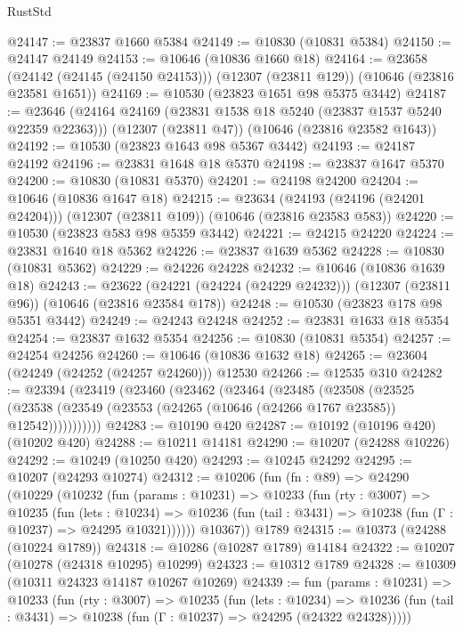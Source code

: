 \begin{lexlean}{RustStd}
\begin{coremodule}
@24147 := @23837 @1660 @5384
@24149 := @10830 (@10831 @5384)
@24150 := @24147 @24149
@24153 := @10646 (@10836 @1660 @18)
@24164 := @23658
    (@24142 (@24145 (@24150 @24153)))
    (@12307 (@23811 @129))
    (@10646 (@23816 @23581 @1651))
@24169 := @10530 (@23823 @1651 @98 @5375 @3442)
@24187 := @23646
    (@24164 @24169 (@23831 @1538 @18 @5240 (@23837 @1537 @5240 @22359 @22363)))
    (@12307 (@23811 @47))
    (@10646 (@23816 @23582 @1643))
@24192 := @10530 (@23823 @1643 @98 @5367 @3442)
@24193 := @24187 @24192
@24196 := @23831 @1648 @18 @5370
@24198 := @23837 @1647 @5370
@24200 := @10830 (@10831 @5370)
@24201 := @24198 @24200
@24204 := @10646 (@10836 @1647 @18)
@24215 := @23634
    (@24193 (@24196 (@24201 @24204)))
    (@12307 (@23811 @109))
    (@10646 (@23816 @23583 @583))
@24220 := @10530 (@23823 @583 @98 @5359 @3442)
@24221 := @24215 @24220
@24224 := @23831 @1640 @18 @5362
@24226 := @23837 @1639 @5362
@24228 := @10830 (@10831 @5362)
@24229 := @24226 @24228
@24232 := @10646 (@10836 @1639 @18)
@24243 := @23622
    (@24221 (@24224 (@24229 @24232)))
    (@12307 (@23811 @96))
    (@10646 (@23816 @23584 @178))
@24248 := @10530 (@23823 @178 @98 @5351 @3442)
@24249 := @24243 @24248
@24252 := @23831 @1633 @18 @5354
@24254 := @23837 @1632 @5354
@24256 := @10830 (@10831 @5354)
@24257 := @24254 @24256
@24260 := @10646 (@10836 @1632 @18)
@24265 := @23604 (@24249 (@24252 (@24257 @24260))) @12530
@24266 := @12535 @310
@24282 := @23394
    (@23419
      (@23460
        (@23462
          (@23464
            (@23485
              (@23508
                (@23525
                  (@23538 (@23549 (@23553 (@24265 (@10646 (@24266 @1767 @23585)) @12542)))))))))))
@24283 := @10190 @420
@24287 := @10192 (@10196 @420) (@10202 @420)
@24288 := @10211 @14181
@24290 := @10207 (@24288 @10226)
@24292 := @10249 (@10250 @420)
@24293 := @10245 @24292
@24295 := @10207 (@24293 @10274)
@24312 := @10206
    (fun (fn : @89) =>
    @24290
      (@10229
        (@10232
          (fun (params : @10231) =>
          @10233
            (fun (rty : @3007) =>
            @10235
              (fun (lets : @10234) =>
              @10236 (fun (tail : @3431) => @10238 (fun (Γ : @10237) => @24295 @10321))))))
        @10367))
    @1789
@24315 := @10373 (@24288 (@10224 @1789))
@24318 := @10286 (@10287 @1789) @14184
@24322 := @10207 (@10278 (@24318 @10295) @10299)
@24323 := @10312 @1789
@24328 := @10309 (@10311 @24323 @14187 @10267 @10269)
@24339 := fun (params : @10231) =>
  @10233
    (fun (rty : @3007) =>
    @10235
      (fun (lets : @10234) =>
      @10236 (fun (tail : @3431) => @10238 (fun (Γ : @10237) => @24295 (@24322 @24328)))))

\end{coremodule}
\end{lexlean}
